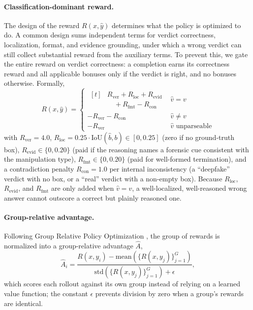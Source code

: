 \documentclass[10pt,twocolumn,letterpaper]{article}
\begin{document}
\paragraph{Classification-dominant reward.} The design of the reward $R(x,\hat y)$ determines what the policy is optimized to do. A common design sums independent terms for verdict correctness, localization, format, and evidence grounding, under which a wrong verdict can still collect substantial reward from the auxiliary terms. To prevent this, we gate the entire reward on verdict correctness: a completion earns its correctness reward and all applicable bonuses only if the verdict is right, and no bonuses otherwise. Formally,
\begin{equation}
R(x,\hat y) = \begin{cases}
\begin{aligned}[t]&R_{\mathrm{ver}} + R_{\mathrm{loc}} + R_{\mathrm{evid}}\\[-2pt] &\quad + R_{\mathrm{fmt}} - R_{\mathrm{con}}\end{aligned} & \hat v = v \\[6pt]
-R_{\mathrm{ver}} - R_{\mathrm{con}} & \hat v \ne v \\[2pt]
-R_{\mathrm{ver}} & \hat v \text{ unparseable}
\end{cases}
\label{eq:reward}
\end{equation}
with $R_{\mathrm{ver}} = 4.0$, $R_{\mathrm{loc}} = 0.25\cdot\mathrm{IoU}(\hat b, b) \in [0, 0.25]$ (zero if no ground-truth box), $R_{\mathrm{evid}} \in \{0, 0.20\}$ (paid if the reasoning names a forensic cue consistent with the manipulation type), $R_{\mathrm{fmt}} \in \{0, 0.20\}$ (paid for well-formed termination), and a contradiction penalty $R_{\mathrm{con}} = 1.0$ per internal inconsistency (a ``deepfake'' verdict with no box, or a ``real'' verdict with a non-empty box). Because $R_{\mathrm{loc}}$, $R_{\mathrm{evid}}$, and $R_{\mathrm{fmt}}$ are only added when $\hat v = v$, a well-localized, well-reasoned wrong answer cannot outscore a correct but plainly reasoned one.

\paragraph{Group-relative advantage.} Following Group Relative Policy Optimization \cite{grpo2024}, the group of rewards is normalized into a group-relative advantage $\hat A$,
\begin{equation}
\hat A_i = \frac{R(x,y_i) - \mathrm{mean}(\{R(x,y_j)\}_{j=1}^G)}{\mathrm{std}(\{R(x,y_j)\}_{j=1}^G) + \epsilon},
\label{eq:adv}
\end{equation}
which scores each rollout against its own group instead of relying on a learned value function; the constant $\epsilon$ prevents division by zero when a group's rewards are identical.
\end{document}

